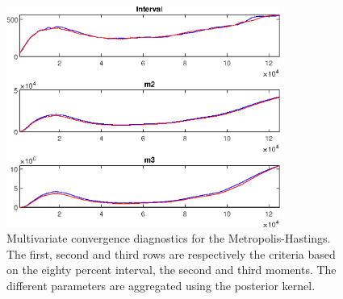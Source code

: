  
\begin{figure}[H]
\centering 
\includegraphics[width=0.8\textwidth]{BRS_sectoral/Output/BRS_sectoral_mdiag}
\caption{Multivariate convergence diagnostics for the Metropolis-Hastings.
The first, second and third rows are respectively the criteria based on
the eighty percent interval, the second and third moments. The different 
parameters are aggregated using the posterior kernel.}\label{Fig:MultivariateDiagnostics}
\end{figure}

